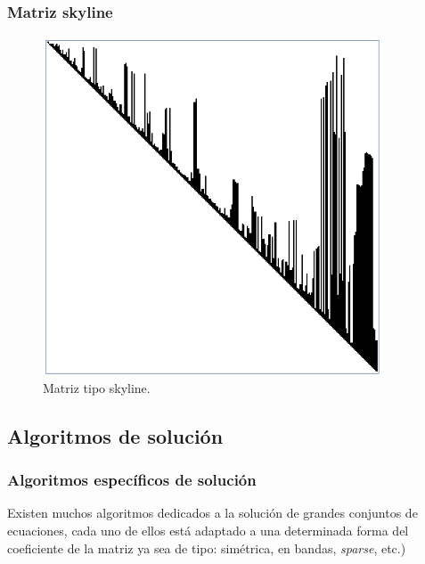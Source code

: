 \begin{frame}
\frametitle{Matriz skyline}
\begin{figure}[h!]
    \centering
    \includegraphics[scale=0.6]{Imagenes/tipo_matrices_03_skyline.png}
    \caption{Matriz tipo skyline.}
\end{figure}
\end{frame}
\subsection{Algoritmos de solución}
\begin{frame}
\frametitle{Algoritmos específicos de solución}
Existen muchos algoritmos dedicados a la solución de grandes conjuntos de ecuaciones, cada uno de ellos está adaptado a una determinada forma del coeficiente de la matriz ya sea de tipo: simétrica, en bandas, \emph{sparse}, etc.)
\end{frame}
